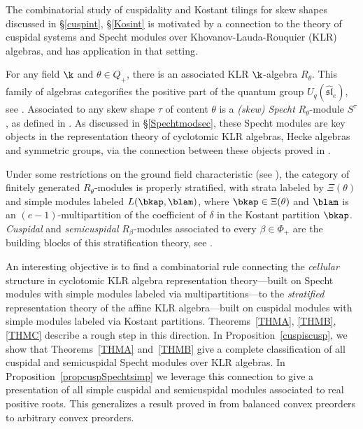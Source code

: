 The combinatorial study of cuspidality and Kostant tilings for skew shapes discussed in \S\ref{cuspint}, \S\ref{Kosint} is motivated by a connection to the theory of cuspidal systems and Specht modules over Khovanov-Lauda-Rouquier (KLR) algebras, and has application in that setting.

For any field \(\k\) and \(\theta \in Q_+\), there is an associated KLR \(\k\)-algebra \(R_\theta\). This family of algebras categorifies the positive part of the quantum group \(U_q(\widehat{\mathfrak{sl}}_e)\), see \cite{KhoLauDiagCat1, KhoLauDiagCat2, Rouq2KM}. Associated to any skew shape \(\tau\) of content \(\theta\) is a {\em (skew) Specht} \(R_\theta\)-module \(S^\tau\), as defined in \cite{KMRUnivSpecht, MuSkew}. As discussed in \S\ref{Spechtmodsec}, these Specht modules are key objects in the representation theory of cyclotomic KLR algebras, Hecke algebras and symmetric groups, via the connection between these objects proved in \cite{BrKlBloCyc}.

Under some restrictions on the ground field characteristic (see \cite{KlMuStrat}), the category of finitely generated \(R_\theta\)-modules is properly stratified, with strata labeled by \(\Xi(\theta)\) and simple modules labeled \(L(\bkap, \blam)\), where \(\bkap \in \Xi(\theta)\) and \(\blam\) is an \((e-1)\)-multipartition of the coefficient of \(\delta\) in the Kostant partition \(\bkap\). {\em Cuspidal} and {\em semicuspidal} \(R_\beta\)-modules associated to every \(\beta \in \Phi_+\) are the building blocks of this stratification theory, see \cite{KlCuspSys, McNRepKLR3, KlMuStrat}.

An interesting objective is to find a combinatorial rule connecting the {\em cellular} structure in cyclotomic KLR algebra representation theory---built on Specht modules with simple modules labeled via multipartitions---to the {\em stratified} representation theory of the affine KLR algebra---built on cuspidal modules with simple modules labeled via Kostant partitions. Theorems~\ref{THMA}, \ref{THMB}, \ref{THMC} describe a rough step in this direction. 
In Proposition~\ref{cuspiscusp}, we show that Theorems~\ref{THMA} and~\ref{THMB} give a complete classification of all cuspidal and semicuspidal Specht modules over KLR algebras. In Proposition~\ref{propcuspSpechtsimp} we leverage this connection to give a presentation of all simple cuspidal and semicuspidal modules associated to real positive roots. This generalizes a result proved in \cite{MuSkew} from balanced convex preorders to arbitrary convex preorders. 

